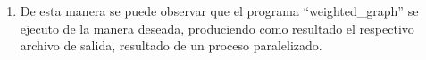 \begin{enumerate}
	 

	 

	\item De esta manera se puede observar que el programa ``weighted\_graph'' se ejecuto de la manera deseada, produciendo como resultado el respectivo archivo de salida, resultado de un proceso paralelizado.


\end{enumerate}
 